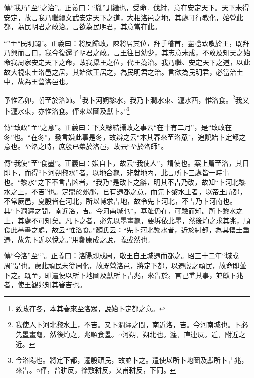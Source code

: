 {\noindent\zhuan{}\fzbyks 傳“我乃”至“之治”。正義曰：“胤”訓繼也，受命，伐紂，意在安定天下。天下未得安定，故言我乃繼續文武安定天下之道，大相洛邑之地，其處可行教化，始營此都，為民明君之政治。言欲為民明君，其意當在此。 \par}

{\noindent\shu{}\fzkt “”至“民明闢”。正義曰：將反歸政，陳將居其位，拜手稽首，盡禮致敬於王，既拜乃興而言曰，我今復還子明君之政。言王往日幼少，其志意未成，不敢及知天之始命我周家安定天下之命，故我攝王之位，代王為治。我乃繼、安定天下之道，以此故大視東土洛邑之居，其始欲王居之，為民明君之治。言欲為民明君，必當治土中，故為王營洛邑也。 \par}

予惟乙卯，朝至於洛師。\footnote{致政在冬，本其春來至洛眾，說始卜定都之意。}我卜河朔黎水，我乃卜澗水東、瀍水西，惟洛食。\footnote{我使人卜河北黎水上，不吉。又卜澗瀍之間，南近洛，吉。今河南城也。卜必先墨畫龜，然後灼之，兆順食墨。○河朔，朔北也。瀍，直連反。近，附近之近。}我又卜瀍水東，亦惟洛食。伻來以圖及獻卜。”\footnote{今洛陽也。將定下都，遷殷頑民，故並卜之。遣使以所卜地圖及獻所卜吉兆，來告。○伻，普耕反，徐敷耕反，又甫耕反，下同。}


{\noindent\zhuan{}\fzbyks 傳“致政”至“之意”。正義曰：下文總結攝政之事云“在十有二月”，是“致政在冬”也。“在冬”，發言嫌此事是冬，故辨之云“本其春來至洛眾”，追說始卜定都之意也。至洛之時，庶殷已集於洛邑，故云“至於洛師”。 \par}

{\noindent\zhuan{}\fzbyks 傳“我使”至“食墨”。正義曰：嫌自卜，故云“我使人”，謂使也。案上篇至洛，其日即卜，而得“卜河朔黎水”者，以地合龜，非就地內，此言所卜三處皆一時事也。“黎水”之下不言吉凶者，“我乃”是改卜之辭，明其不吉乃改，故知“卜河北黎水之上，不吉”也。定鼎於郟鄏，已有遷都之意，而先卜黎水上者，以帝王所都，不常厥邑，夏殷皆在河北，所以博求吉地，故令先卜河北，不吉乃卜河南也。其“卜澗瀍之間，南近洛，吉。今河南城也”，基趾仍在，可驗而知。所卜黎水之上，其處不可知矣。凡卜之者，必先以墨畫龜，要坼依此墨，然後灼之求其兆，順食此墨畫之處，故云“惟洛食。”顏氏云：“先卜河北黎水者，近於紂都，為其懷土重遷，故先卜近以悅之。”用鄭康成之說，義或然也。 \par}

{\noindent\zhuan{}\fzbyks 傳“今洛”至“”。正義曰：洛陽即成周，敬王自王城遷而都之。昭三十二年“城成周”是也。慮此頑民未從周化，故既營洛邑，將定下都，以遷殷之頑民，故命即並卜之。既至，即遣使以所卜地圖及獻所卜吉兆，來告於。言己重其事，並獻卜兆者，使王觀兆知其審吉也。 \par}

